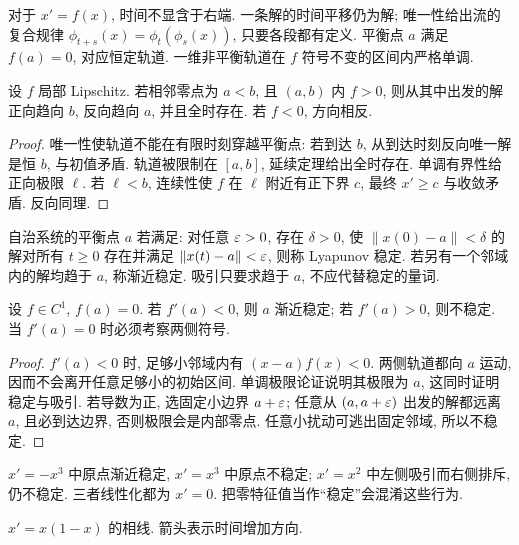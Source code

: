 对于 $x'=f(x)$, 时间不显含于右端. 一条解的时间平移仍为解; 唯一性给出流的复合规律 $\phi_{t+s}(x)=\phi_t(\phi_s(x))$, 只要各段都有定义. 平衡点 $a$ 满足 $f(a)=0$, 对应恒定轨道. 一维非平衡轨道在 $f$ 符号不变的区间内严格单调.
\begin{proposition}
设 $f$ 局部 Lipschitz. 若相邻零点为 $a<b$, 且 $(a,b)$ 内 $f>0$, 则从其中出发的解正向趋向 $b$, 反向趋向 $a$, 并且全时存在. 若 $f<0$, 方向相反.
\end{proposition}
\begin{proof}
唯一性使轨道不能在有限时刻穿越平衡点: 若到达 $b$, 从到达时刻反向唯一解是恒 $b$, 与初值矛盾. 轨道被限制在 $[a,b]$, 延续定理给出全时存在. 单调有界性给正向极限 $\ell$. 若 $\ell<b$, 连续性使 $f$ 在 $\ell$ 附近有正下界 $c$, 最终 $x'\ge c$ 与收敛矛盾. 反向同理.
\end{proof}
\begin{definition}
自治系统的平衡点 $a$ 若满足: 对任意 $\varepsilon>0$, 存在 $\delta>0$, 使 $\|x(0)-a\|<\delta$ 的解对所有 $t\ge0$ 存在并满足 $\|x(t)-a\|<\varepsilon$, 则称 Lyapunov 稳定. 若另有一个邻域内的解均趋于 $a$, 称渐近稳定. 吸引只要求趋于 $a$, 不应代替稳定的量词.
\end{definition}
\begin{theorem}[一维判别]
设 $f\in C^1$, $f(a)=0$. 若 $f'(a)<0$, 则 $a$ 渐近稳定; 若 $f'(a)>0$, 则不稳定. 当 $f'(a)=0$ 时必须考察两侧符号.
\end{theorem}
\begin{proof}
$f'(a)<0$ 时, 足够小邻域内有 $(x-a)f(x)<0$. 两侧轨道都向 $a$ 运动, 因而不会离开任意足够小的初始区间. 单调极限论证说明其极限为 $a$, 这同时证明稳定与吸引. 若导数为正, 选固定小边界 $a+\varepsilon$; 任意从 $(a,a+\varepsilon)$ 出发的解都远离 $a$, 且必到达边界, 否则极限会是内部零点. 任意小扰动可逃出固定邻域, 所以不稳定.
\end{proof}
$x'=-x^3$ 中原点渐近稳定, $x'=x^3$ 中原点不稳定; $x'=x^2$ 中左侧吸引而右侧排斥, 仍不稳定. 三者线性化都为 $x'=0$. 把零特征值当作“稳定”会混淆这些行为.
\begin{center}

$ x'=x(1-x)$ 的相线. 箭头表示时间增加方向.
\end{center}

